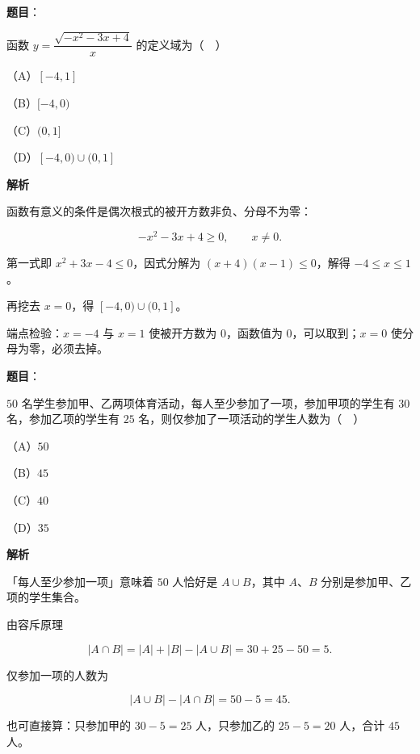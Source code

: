 \begin{answer}

\textbf{题目}：

函数 $y=\dfrac{\sqrt{-x^2-3x+4}}{x}$ 的定义域为（　）

（A）$[-4,1]$

（B）$[-4,0)$

（C）$(0,1]$

（D）$[-4,0)\cup(0,1]$

\textbf{解析}

函数有意义的条件是偶次根式的被开方数非负、分母不为零：

\nopagebreak[4]
\[-x^2-3x+4\geqslant0,\qquad x\neq0.\]

第一式即 $x^2+3x-4\leqslant0$，因式分解为 $(x+4)(x-1)\leqslant0$，解得 $-4\leqslant x\leqslant1$。

再挖去 $x=0$，得 $[-4,0)\cup(0,1]$。

端点检验：$x=-4$ 与 $x=1$ 使被开方数为 $0$，函数值为 $0$，可以取到；$x=0$ 使分母为零，必须去掉。


\end{answer}
\begin{answer}

\textbf{题目}：

$50$ 名学生参加甲、乙两项体育活动，每人至少参加了一项，参加甲项的学生有 $30$ 名，参加乙项的学生有 $25$ 名，则仅参加了一项活动的学生人数为（　）

（A）$50$

（B）$45$

（C）$40$

（D）$35$

\textbf{解析}

「每人至少参加一项」意味着 $50$ 人恰好是 $A\cup B$，其中 $A$、$B$ 分别是参加甲、乙项的学生集合。

由容斥原理

\nopagebreak[4]
\[|A\cap B|=|A|+|B|-|A\cup B|=30+25-50=5.\]

仅参加一项的人数为

\nopagebreak[4]
\[|A\cup B|-|A\cap B|=50-5=45.\]

也可直接算：只参加甲的 $30-5=25$ 人，只参加乙的 $25-5=20$ 人，合计 $45$ 人。


\end{answer}
